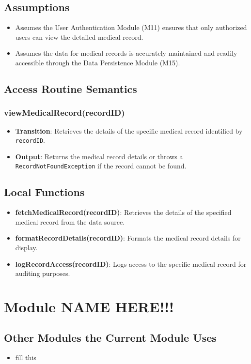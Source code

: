 \documentclass[12pt, titlepage]{article}
\begin{document}
\subsection{Assumptions}
\begin{itemize}
    \item Assumes the User Authentication Module (M11) ensures that only authorized users can view the detailed medical record.
    \item Assumes the data for medical records is accurately maintained and readily accessible through the Data Persistence Module (M15).
\end{itemize}


\subsection{Access Routine Semantics}
\subsubsection{viewMedicalRecord(recordID)}
\begin{itemize}
    \item \textbf{Transition}: Retrieves the details of the specific medical record identified by \texttt{recordID}.
    \item \textbf{Output}: Returns the medical record details or throws a \texttt{RecordNotFoundException} if the record cannot be found.
\end{itemize}

\subsection{Local Functions}
\begin{itemize}
\item \textbf{fetchMedicalRecord(recordID)}: Retrieves the details of the specified medical record from the data source.
\item \textbf{formatRecordDetails(recordID)}: Formats the medical record details for display.
\item \textbf{logRecordAccess(recordID)}: Logs access to the specific medical record for auditing purposes.
\end{itemize}
\section{Module NAME HERE!!!}

\subsection{Other Modules the Current Module Uses}
\begin{itemize}
    \item fill this 
\end{itemize}
\end{document}
